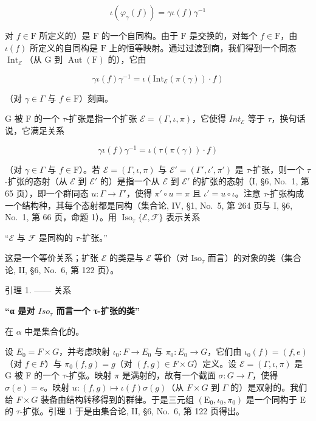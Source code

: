 \[
\iota (\varphi_ {\gamma} (f)) = \gamma \iota (f) \gamma^ {- 1}
\]

对 \(f \in \mathrm{F}\) 所定义的）是 \(\mathrm{F}\) 的一个自同构。由于 \(\mathrm{F}\) 是交换的，对每个 \(f \in \mathrm{F}\)，由 \(\iota(f)\) 所定义的自同构是 \(\mathrm{F}\) 上的恒等映射。通过过渡到商，我们得到一个同态 \(\operatorname{Int}_{\mathcal{E}}\)（从 \(\mathrm{G}\) 到 \(\operatorname{Aut}(\mathrm{F})\) 的），它由

\[
\gamma \iota (f) \gamma^ {- 1} = \iota (\mathrm{Int} _ {\mathcal {E}} (\pi (\gamma)) \cdot f)
\]

（对 \(\gamma \in \Gamma\) 与 \(f\in \mathrm{F}\)）刻画。

G 被 F 的一个 \(\tau\)-扩张是指一个扩张 \(\mathcal{E} = (\Gamma, \iota, \pi)\)，它使得 \(Int_{\mathcal{E}}\) 等于 \(\tau\)，换句话说，它满足关系

\[
\gamma \iota (f) \gamma^ {- 1} = \iota (\tau (\pi (\gamma)) \cdot f)\tag{1}
\]

（对 \(\gamma \in \Gamma\) 与 \(f \in \mathrm{F}\)）。若 \(\mathcal{E} = (\Gamma, \iota, \pi)\) 与 \(\mathcal{E}' = (\Gamma', \iota', \pi')\) 是 \(\tau\)-扩张，则一个 \(\tau\)-扩张的态射（从 \(\mathcal{E}\) 到 \(\mathcal{E}'\) 的）是指一个从 \(\mathcal{E}\) 到 \(\mathcal{E}'\) 的扩张的态射（I, §6, No.~1, 第 65 页），即一个群同态 \(u: \Gamma \to \Gamma'\)，使得 \(\pi' \circ u = \pi\) 且 \(\iota' = u \circ \iota\)。注意 \(\tau\)-扩张构成一个结构种，其每个态射都是同构（集合论, IV, §1, No.~5, 第 264 页与 I, §6, No.~1, 第 66 页，命题 1）。用 \(\operatorname{Iso}_{\tau} \{\mathcal{E}, \mathcal{F}\}\) 表示关系

“\(\mathcal{E}\) 与 \(\mathcal{F}\) 是同构的 \(\tau\)-扩张。”

这是一个等价关系；扩张 \(\mathcal{E}\) 的类是与 \(\mathcal{E}\) 等价（对 \(\mathrm{Iso}_{\tau}\) 而言）的对象的类（集合论, II, §6, No.~6, 第 122 页）。

引理 1. —— 关系

\textbf{\texorpdfstring{“α 是对 \(Iso_{\tau}\) 而言一个 τ-扩张的类”}{“α 是对 Iso\_\{\textbackslash tau\} 而言一个 τ-扩张的类”}}

在 \(\alpha\) 中是集合化的。

设 \(E_{0}=F\times G\)，并考虑映射 \(\iota_{0}:F\to E_{0}\) 与 \(\pi_{0}:E_{0}\to G\)，它们由 \(\iota_{0}(f)=(f,e)\)（对 \(f\in F\)）与 \(\pi_{0}(f,g)=g\)（对 \((f,g)\in F\times G\)）定义。设 \(\mathcal{E}=(\Gamma,\iota,\pi)\) 是 G 被 F 的一个 \(\tau\)-扩张。映射 \(\pi\) 是满射的，故有一个截面 \(\sigma:G\to\Gamma\)，使得 \(\sigma(e)=e\)。映射 \(u:(f,g)\mapsto\iota(f)\sigma(g)\)（从 \(F\times G\) 到 \(\Gamma\) 的）是双射的。我们给 \(F\times G\) 装备由结构转移得到的群律。于是三元组 \((\mathrm{E}_{0},\iota_{0},\pi_{0})\) 是一个同构于 E 的 \(\tau\)-扩张。引理 1 于是由集合论, II, §6, No.~6, 第 122 页得出。

